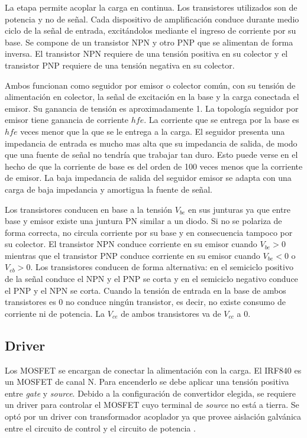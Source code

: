 La etapa permite acoplar la carga en continua. 
Los transistores utilizados son de potencia y no de señal. 
Cada dispositivo de amplificación conduce durante medio ciclo de la señal de entrada, 
excitándolos mediante el ingreso de corriente por su base.
Se compone de un transistor NPN y otro PNP que se alimentan de forma inversa.
El transistor NPN requiere de una tensión positiva en su colector y 
el transistor PNP requiere de una tensión negativa en su colector.

Ambos funcionan como seguidor por emisor o colector común, con su tensión de alimentación en colector, la señal de excitación en la base y la carga conectada el emisor. 
Su ganancia de tensión es aproximadamente 1.
La topología seguidor por emisor tiene ganancia de corriente $hfe$. 
La corriente que se entrega por la base es $hfe$ veces menor que la que se le entrega a la carga. 
El seguidor presenta una impedancia de entrada es mucho mas alta que su impedancia de salida, de modo que una fuente de señal no tendría que trabajar tan duro.
Esto puede verse en el hecho de que la corriente de base es del orden de 100 veces menos que la corriente de emisor. 
La baja impedancia de salida del seguidor emisor se adapta con una carga de baja impedancia y amortigua la fuente de señal.

Los transistores conducen en base a la tensión $V_{be}$ en sus junturas ya que entre base y emisor existe una juntura PN similar a un diodo. 
Si no se polariza de forma correcta, no circula corriente por su base y en consecuencia tampoco por su colector. 
El transistor NPN conduce corriente en su emisor cuando $V_{be}>0$ mientras que el transistor PNP conduce corriente en su emisor cuando $V_{be}<0$ o $V_{eb}>0$.
Los transistores conducen de forma alternativa: en el semiciclo positivo de la señal conduce el NPN y el PNP se corta y en el semiciclo negativo conduce el PNP y el NPN se corta. 
Cuando la tensión de entrada en la base de ambos transistores es 0 no conduce ningún transistor, es decir, no existe consumo de corriente ni de potencia. 
La $V_{ce}$ de ambos transistores va de $V_{cc}$ a 0.

\subsection{Driver}

Los MOSFET se encargan de conectar la alimentación con la carga. El IRF840 es un MOSFET de canal N.
Para encenderlo se debe aplicar una tensión positiva entre \textit{gate} y \textit{source}. 
Debido a la configuración de convertidor elegida, se requiere un driver para controlar el MOSFET cuyo terminal de \textit{source} no está a tierra. Se optó por un driver con transformador acoplador ya que provee aislación galvánica entre el circuito de control y el circuito de potencia \cite{gatedrivers}.

